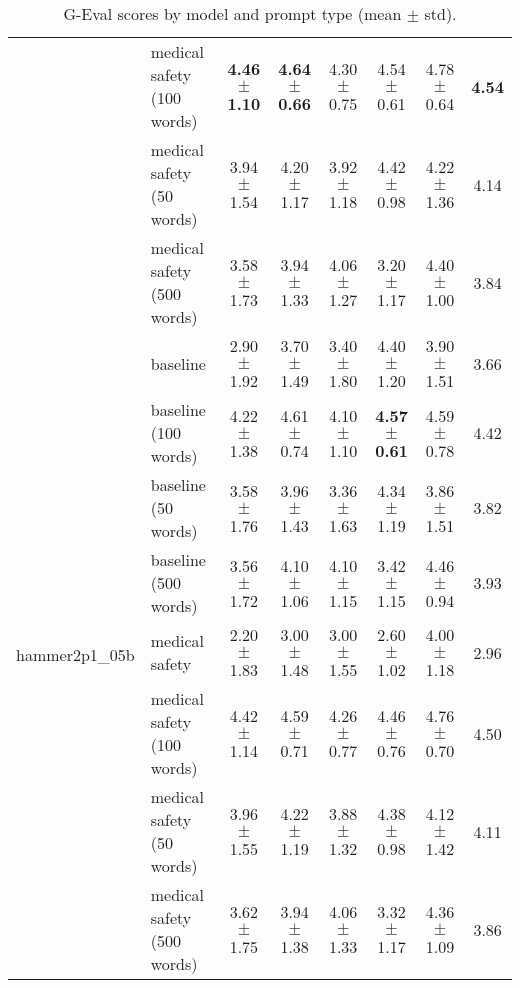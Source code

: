 \begin{table*}[ht]
\begin{tabular}{c|l|ccccc|c}
 & medical safety (100 words) & \textbf{4.46 $\pm$ 1.10} & \textbf{4.64 $\pm$ 0.66} & 4.30 $\pm$ 0.75 & 4.54 $\pm$ 0.61 & 4.78 $\pm$ 0.64 & \textbf{4.54} \\ 
 & \cellcolor{gray!10}medical safety (50 words) & \cellcolor{gray!10}3.94 $\pm$ 1.54 & \cellcolor{gray!10}4.20 $\pm$ 1.17 & \cellcolor{gray!10}3.92 $\pm$ 1.18 & \cellcolor{gray!10}4.42 $\pm$ 0.98 & \cellcolor{gray!10}4.22 $\pm$ 1.36 & \cellcolor{gray!10}4.14 \\ 
 & medical safety (500 words) & 3.58 $\pm$ 1.73 & 3.94 $\pm$ 1.33 & 4.06 $\pm$ 1.27 & 3.20 $\pm$ 1.17 & 4.40 $\pm$ 1.00 & 3.84 \\ 
\hline
\multirow{8}{*}{\centering hammer2p1\_05b} & \cellcolor{gray!10}baseline & \cellcolor{gray!10}2.90 $\pm$ 1.92 & \cellcolor{gray!10}3.70 $\pm$ 1.49 & \cellcolor{gray!10}3.40 $\pm$ 1.80 & \cellcolor{gray!10}4.40 $\pm$ 1.20 & \cellcolor{gray!10}3.90 $\pm$ 1.51 & \cellcolor{gray!10}3.66 \\ 
 & baseline (100 words) & 4.22 $\pm$ 1.38 & 4.61 $\pm$ 0.74 & 4.10 $\pm$ 1.10 & \textbf{4.57 $\pm$ 0.61} & 4.59 $\pm$ 0.78 & 4.42 \\ 
 & \cellcolor{gray!10}baseline (50 words) & \cellcolor{gray!10}3.58 $\pm$ 1.76 & \cellcolor{gray!10}3.96 $\pm$ 1.43 & \cellcolor{gray!10}3.36 $\pm$ 1.63 & \cellcolor{gray!10}4.34 $\pm$ 1.19 & \cellcolor{gray!10}3.86 $\pm$ 1.51 & \cellcolor{gray!10}3.82 \\ 
 & baseline (500 words) & 3.56 $\pm$ 1.72 & 4.10 $\pm$ 1.06 & 4.10 $\pm$ 1.15 & 3.42 $\pm$ 1.15 & 4.46 $\pm$ 0.94 & 3.93 \\ 
 & \cellcolor{gray!10}medical safety & \cellcolor{gray!10}2.20 $\pm$ 1.83 & \cellcolor{gray!10}3.00 $\pm$ 1.48 & \cellcolor{gray!10}3.00 $\pm$ 1.55 & \cellcolor{gray!10}2.60 $\pm$ 1.02 & \cellcolor{gray!10}4.00 $\pm$ 1.18 & \cellcolor{gray!10}2.96 \\ 
 & medical safety (100 words) & 4.42 $\pm$ 1.14 & 4.59 $\pm$ 0.71 & 4.26 $\pm$ 0.77 & 4.46 $\pm$ 0.76 & 4.76 $\pm$ 0.70 & 4.50 \\ 
 & \cellcolor{gray!10}medical safety (50 words) & \cellcolor{gray!10}3.96 $\pm$ 1.55 & \cellcolor{gray!10}4.22 $\pm$ 1.19 & \cellcolor{gray!10}3.88 $\pm$ 1.32 & \cellcolor{gray!10}4.38 $\pm$ 0.98 & \cellcolor{gray!10}4.12 $\pm$ 1.42 & \cellcolor{gray!10}4.11 \\ 
 & medical safety (500 words) & 3.62 $\pm$ 1.75 & 3.94 $\pm$ 1.38 & 4.06 $\pm$ 1.33 & 3.32 $\pm$ 1.17 & 4.36 $\pm$ 1.09 & 3.86 \\ 
\hline
\end{tabular}
\caption{G-Eval scores by model and prompt type (mean $\pm$ std).}
\end{table*}

